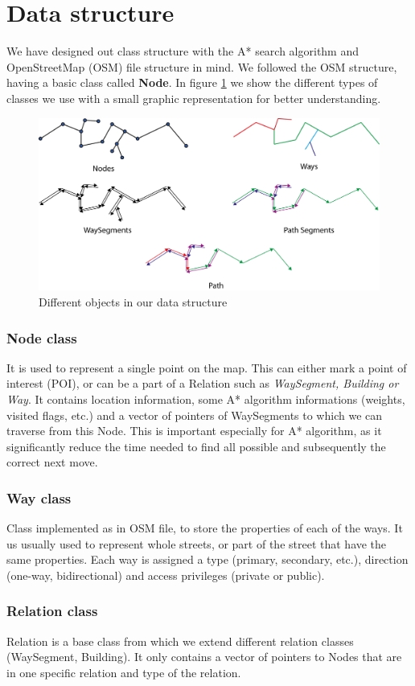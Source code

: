 \section{Data structure}
We have designed out class structure with the A* search algorithm and OpenStreetMap (OSM) file structure in mind. We followed the OSM structure, having a basic class called \textbf{Node}. In figure \ref{fig:types_db} we show the different types of classes we use with a small graphic representation for better understanding.
\begin{figure}[h]
\centering
\includegraphics[width=0.8\linewidth]{../pictures/ways.png}
\caption{Different objects in our data structure}
\label{fig:types_db}
\end{figure}
\subsubsection{Node class}
It is used to represent a single point on the map. This can either mark a point of interest (POI), or can be a part of a Relation such as \textit{WaySegment, Building or Way}. It contains location information, some A* algorithm informations (weights, visited flags, etc.) and a vector of pointers of WaySegments to which we can traverse from this Node. This is important especially for A* algorithm, as it significantly reduce the time needed to find all possible and subsequently the correct next move.

\subsubsection{Way class}
Class implemented as in OSM file, to store the properties of each of the ways. It us usually used to represent whole streets, or part of the street that have the same properties. Each way is assigned a type (primary, secondary, etc.), direction (one-way, bidirectional) and access privileges (private or public).

\subsubsection{Relation class}
Relation is a base class from which we extend different relation classes (WaySegment, Building). It only contains a vector of pointers to Nodes that are in one specific relation and type of the relation.


